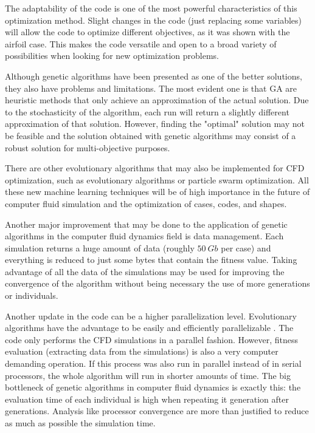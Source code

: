 The adaptability of the code is one of the most powerful characteristics of this optimization method. Slight changes in the code (just replacing some variables) will allow the code to optimize different objectives, as it was shown with the airfoil case. This makes the code versatile and open to a broad variety of possibilities when looking for new optimization problems.

Although genetic algorithms have been presented as one of the better solutions, they also have problems and limitations. The most evident one is that GA are heuristic methods that only achieve an approximation of the actual solution. Due to the stochasticity of the algorithm, each run will return a slightly different approximation of that solution. However, finding the "optimal" solution may not be feasible and the solution obtained with genetic algorithms may consist of a robust solution for multi-objective purposes. 

There are other evolutionary algorithms that may also be implemented for CFD optimization, such as evolutionary algorithms or particle swarm optimization. All these new machine learning techniques will be of high importance in the future of computer fluid simulation and the optimization of cases, codes, and shapes. 

Another major improvement that may be done to the application of genetic algorithms in the computer fluid dynamics field is data management. Each simulation returns a huge amount of data (roughly $50\ Gb$ per case) and everything is reduced to just some bytes that contain the fitness value. Taking advantage of all the data of the simulations may be used for improving the convergence of the algorithm without being necessary the use of more generations or individuals. 

Another update in the code can be a higher parallelization level. Evolutionary algorithms have the advantage to be easily and efficiently parallelizable \cite{thevenin2008and}. The code only performs the CFD simulations in a parallel fashion. However, fitness evaluation (extracting data from the simulations) is also a very computer demanding operation. If this process was also run in parallel instead of in serial processors, the whole algorithm will run in shorter amounts of time. The big bottleneck of genetic algorithms in computer fluid dynamics is exactly this: the evaluation time of each individual is high when repeating it generation after generations. Analysis like processor convergence are more than justified to reduce as much as possible the simulation time.

